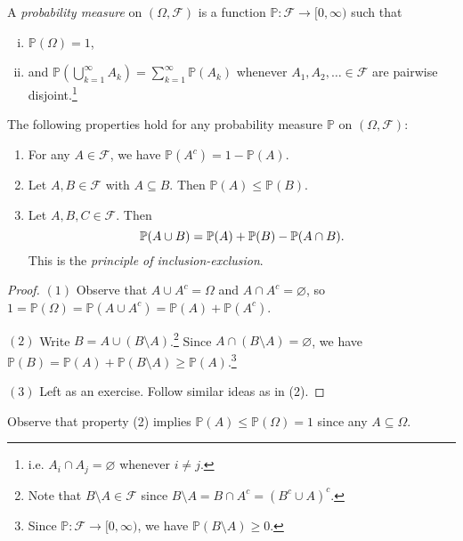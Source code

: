 \begin{definition}
  A \emph{probability measure} on $(\Omega, \mathcal{F})$ is a function
  $\mathbb{P} : \mathcal{F} \to [0, \infty)$
  such that
  \begin{enumerate}[(i)]
    \item $\mathbb{P}(\Omega) = 1$,
    \item and $\mathbb{P}(\bigcup_{k = 1}^\infty A_k) = \sum_{k = 1}^\infty \mathbb{P}(A_k)$
      whenever $A_1, A_2, \dots \in \mathcal{F}$ are pairwise disjoint.\footnote{i.e. $A_i \cap A_j = \varnothing$ whenever $i \ne j$.}
  \end{enumerate}
\end{definition}

\begin{prop}
  The following properties hold for any
  probability measure $\mathbb{P}$ on
  $(\Omega, \mathcal{F})$:
  \begin{enumerate}[(1)]
    \item For any $A \in \mathcal{F}$,
      we have $\mathbb{P}(A^c) = 1 - \mathbb{P}(A)$.
    \item Let $A, B \in \mathcal{F}$ with
      $A \subseteq B$. Then $\mathbb{P}(A) \le \mathbb{P}(B)$.
    \item Let $A, B, C \in \mathcal{F}$. Then
      \[
        \mathbb{P}(A \cup B) = \mathbb{P}(A) + \mathbb{P}(B) - \mathbb{P}(A \cap B).
      \]
      This is the \emph{principle of inclusion-exclusion}.
  \end{enumerate}
\end{prop}

\begin{proof}
  $(1)$ Observe that $A \cup A^c = \Omega$ and
  $A \cap A^c = \varnothing$, so
  $1 = \mathbb{P}(\Omega) = \mathbb{P}(A \cup A^c) = \mathbb{P}(A) + \mathbb{P}(A^c)$.

  $(2)$ Write $B = A \cup (B \setminus A)$.\footnote{Note that $B \setminus A \in \mathcal{F}$ since $B \setminus A = B \cap A^c = (B^c \cup A)^c$.} Since
  $A \cap (B \setminus A) = \varnothing$,
  we have $\mathbb{P}(B) = \mathbb{P}(A) + \mathbb{P}(B \setminus A) \ge \mathbb{P}(A)$.\footnote{Since $\mathbb{P} : \mathcal{F} \to [0, \infty)$, we have $\mathbb{P}(B \setminus A) \ge 0$.}

  $(3)$ Left as an exercise. Follow similar ideas
  as in (2).
\end{proof}

\begin{remark}
  Observe that property (2) implies
  $\mathbb{P}(A) \le \mathbb{P}(\Omega) = 1$
  since any $A \subseteq \Omega$.
\end{remark}

